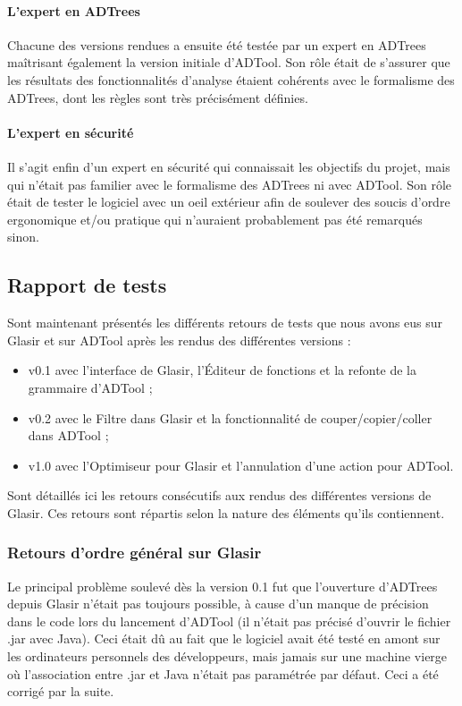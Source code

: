 \paragraph{L'expert en ADTrees} Chacune des versions rendues a ensuite été testée par un expert en ADTrees maîtrisant également la version initiale d'ADTool. Son rôle était de s'assurer que les résultats des fonctionnalités d'analyse étaient cohérents avec le formalisme des ADTrees, dont les règles sont très précisément définies.

\paragraph{L'expert en sécurité} Il s'agit enfin d'un expert en sécurité qui connaissait les objectifs du projet, mais qui n'était pas familier avec le formalisme des ADTrees ni avec ADTool. Son rôle était de tester le logiciel avec un oeil \og extérieur \fg{} afin de soulever des soucis d'ordre ergonomique et/ou pratique qui n'auraient probablement pas été remarqués sinon.

\subsection{Rapport de tests}
\label{subsec:tests}

Sont maintenant présentés les différents retours de tests que nous avons eus sur Glasir et sur ADTool après les rendus des différentes versions : 
\begin{itemize}
	\item v0.1 avec l'interface de Glasir, l'Éditeur de fonctions et la refonte de la grammaire d'ADTool ;
	\item v0.2 avec le Filtre dans Glasir et la fonctionnalité de couper/copier/coller dans ADTool ;
	\item v1.0 avec l'Optimiseur pour Glasir et l'annulation d'une action pour ADTool.
\end{itemize}

Sont détaillés ici les retours consécutifs aux rendus des différentes versions de Glasir. Ces retours sont répartis selon la nature des éléments qu'ils contiennent.

\subsubsection{Retours d'ordre général sur Glasir}
\label{subsubsec:fonctglob}

Le principal problème soulevé dès la version 0.1 fut que l'ouverture d'ADTrees depuis Glasir n'était pas toujours possible, à cause d'un manque de précision dans le code lors du lancement d'ADTool (il n'était pas précisé d'ouvrir le fichier .jar avec Java). Ceci était dû au fait que le logiciel avait été testé en amont sur les ordinateurs personnels des développeurs, mais jamais sur une machine vierge où l'association entre .jar et Java n'était pas paramétrée par défaut. Ceci a été corrigé par la suite. 

